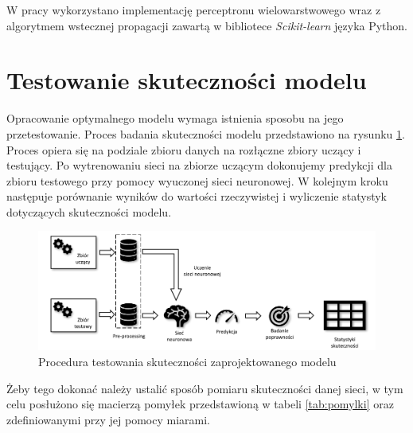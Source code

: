 \documentclass[inzynierska]{pwr_wmat_praca_dyplomowa}
\theoremstyle{plain}
\numberwithin{theorem}{chapter}
\theoremstyle{definition}
\numberwithin{theorem}{chapter}
\begin{document}
W pracy wykorzystano implementację perceptronu wielowarstwowego wraz z algorytmem wstecznej propagacji zawartą w bibliotece \textit{Scikit-learn}\cite{skleaarn} języka Python. 

\section{Testowanie skuteczności modelu}
Opracowanie optymalnego modelu wymaga istnienia sposobu na jego przetestowanie. Proces badania skuteczności modelu przedstawiono na rysunku \ref{proces-caly}. Proces opiera się na podziale zbioru danych na rozłączne zbiory uczący i testujący. Po wytrenowaniu sieci na zbiorze uczącym dokonujemy predykcji dla zbioru testowego przy pomocy wyuczonej sieci neuronowej. W kolejnym kroku następuje porównanie wyników do wartości rzeczywistej i wyliczenie statystyk dotyczących skuteczności modelu. 
\begin{figure}[ht]
	\centering
	\includegraphics[scale=0.9]{images/system2_c.pdf}
	\caption{Procedura testowania skuteczności zaprojektowanego modelu}
	\label{proces-caly}
\end{figure} 

Żeby tego dokonać należy ustalić sposób pomiaru skuteczności danej sieci, w tym celu posłużono się macierzą pomyłek przedstawioną w tabeli \ref{tab:pomylki} oraz zdefiniowanymi przy jej pomocy miarami.
\end{document}
